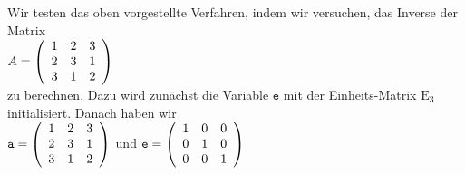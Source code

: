 \example
Wir testen das oben vorgestellte Verfahren, indem wir versuchen, das Inverse der Matrix
\\[0.2cm]
\hspace*{1.3cm}
$A = \left(
  \begin{array}[c]{lll}
    1 & 2 & 3     \\
    2 & 3 & 1     \\
    3 & 1 & 2            
  \end{array}\right)
$
\\[0.2cm]
zu berechnen.  Dazu wird zun\"{a}chst die Variable $\mathtt{e}$ mit der Einheits-Matrix $\mathrm{E}_3$
initialisiert.  Danach haben wir
\\[0.2cm]
\hspace*{1.3cm}
$\mathtt{a} = \left(
  \begin{array}[c]{lll}
    1 & 2 & 3     \\
    2 & 3 & 1     \\
    3 & 1 & 2            
  \end{array}\right)
$
\quad und \quad
$\mathtt{e} = \left(
  \begin{array}[c]{lll}
    1 & 0 & 0     \\
    0 & 1 & 0     \\
    0 & 0 & 1            
  \end{array}\right)
$
 \\[0.2cm]
